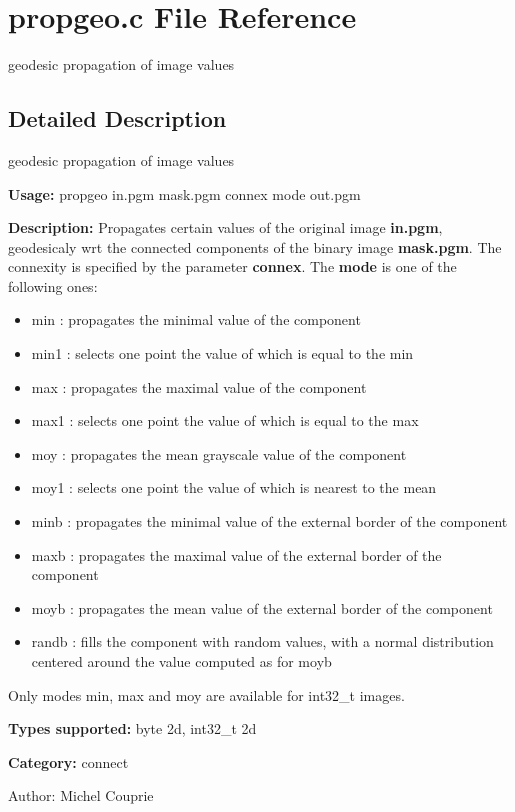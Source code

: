 \section{propgeo.c File Reference}
\label{propgeo_8c}
geodesic propagation of image values 



\subsection{Detailed Description}
geodesic propagation of image values 

{\bf Usage:} propgeo in.pgm mask.pgm connex mode out.pgm

{\bf Description:} Propagates certain values of the original image {\bf in.pgm}, geodesicaly wrt the connected components of the binary image {\bf mask.pgm}. The connexity is specified by the parameter {\bf connex}. The {\bf mode} is one of the following ones: \begin{itemize}
\item min : propagates the minimal value of the component \item min1 : selects one point the value of which is equal to the min \item max : propagates the maximal value of the component \item max1 : selects one point the value of which is equal to the max \item moy : propagates the mean grayscale value of the component \item moy1 : selects one point the value of which is nearest to the mean \item minb : propagates the minimal value of the external border of the component \item maxb : propagates the maximal value of the external border of the component \item moyb : propagates the mean value of the external border of the component \item randb : fills the component with random values, with a normal distribution centered around the value computed as for moyb\end{itemize}
Only modes min, max and moy are available for int32\_\-t images.

{\bf Types supported:} byte 2d, int32\_\-t 2d

{\bf Category:} connect

\begin{Desc}
\item[Author:]Michel Couprie \end{Desc}
